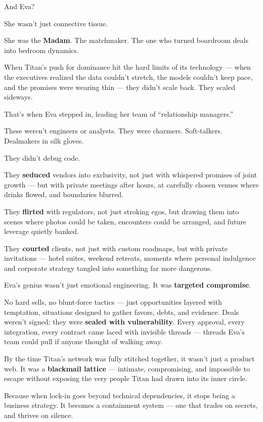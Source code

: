 \medskip

And Eva?

She wasn’t just connective tissue.

She was the \textbf{Madam}.  
The matchmaker.  
The one who turned boardroom deals into bedroom dynamics.

When Titan’s push for dominance hit the hard limits of its technology — when the executives realized the data couldn’t stretch, the models couldn’t keep pace, and the promises were wearing thin — they didn’t scale back.  
They scaled sideways.

That’s when Eva stepped in, leading her team of “relationship managers.”

These weren’t engineers or analysts.  
They were charmers.  
Soft-talkers.  
Dealmakers in silk gloves.

They didn’t debug code.

They \textbf{seduced} vendors into exclusivity, not just with whispered promises of joint growth — but with private meetings after hours, at carefully chosen venues where drinks flowed, and boundaries blurred.

They \textbf{flirted} with regulators, not just stroking egos, but drawing them into scenes where photos could be taken, encounters could be arranged, and future leverage quietly banked.

They \textbf{courted} clients, not just with custom roadmaps, but with private invitations — hotel suites, weekend retreats, moments where personal indulgence and corporate strategy tangled into something far more dangerous.

Eva’s genius wasn’t just emotional engineering.  It was \textbf{targeted compromise}.

No hard sells, no blunt-force tactics — just opportunities layered with temptation, situations designed to gather favors, debts, and evidence.
Deals weren’t signed; they were \textbf{sealed with vulnerability}.
Every approval, every integration, every contract came laced with invisible threads — threads Eva’s team could pull if anyone thought of walking away.

By the time Titan’s network was fully stitched together, it wasn’t just a product web.
It was a \textbf{blackmail lattice} — intimate, compromising, and impossible to escape without exposing the very people Titan had drawn into its inner circle.

Because when lock-in goes beyond technical dependencies, it stops being a business strategy.
It becomes a containment system —
one that trades on secrets, and thrives on silence.

